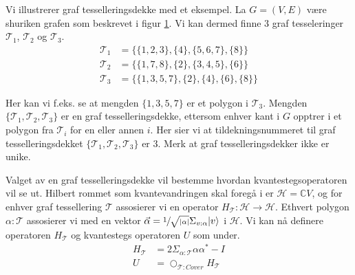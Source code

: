 \begin{figure}
\begin{center}
\begin{tcolorbox}
\begin{subfigure}{0.32\textwidth}
\begin{tikzpicture}[main/.style={draw,circle}, scale=0.75]
                        \end{tikzpicture}
                    \end{subfigure}
                \end{tcolorbox}
            \end{center}
            \label{fig:shuriken}
        \end{figure}

        Vi illustrerer graf tesselleringsdekke med et eksempel. La $G=(V,E)$ være shuriken grafen som beskrevet i figur \ref{fig:shuriken}. Vi kan dermed finne $3$ graf tesseleringer $\mathcal{T}_1$, $\mathcal{T}_2$ og $\mathcal{T}_3$.
        \begin{align*}
            \mathcal{T}_1 & = \{\{1,2,3\},\{4\},\{5,6,7\},\{8\}\} \\
            \mathcal{T}_2 & = \{\{1,7,8\},\{2\},\{3,4,5\},\{6\}\} \\
            \mathcal{T}_3 & = \{\{1,3,5,7\},\{2\},\{4\},\{6\},\{8\}\}
        \end{align*}

        Her kan vi f.eks. se at mengden $\{1,3,5,7\}$ er et polygon i $\mathcal{T}_3$. Mengden $\{\mathcal{T}_1, \mathcal{T}_2, \mathcal{T}_3\}$ er en graf tesselleringsdekke, ettersom enhver kant i $G$ opptrer i et polygon fra $\mathcal{T}_i$ for en eller annen $i$. Her sier vi at tildekningsnummeret til graf tesselleringsdekket $\{\mathcal{T}_1, \mathcal{T}_2, \mathcal{T}_3\}$ er $3$. Merk at graf tesselleringsdekker ikke er unike.

        Valget av en graf tesselleringsdekke vil bestemme hvordan kvantestegsoperatoren vil se ut. Hilbert rommet som kvantevandringen skal foregå i er $\mathcal{H}=\mathbb{C}V$, og for enhver graf tessellering $\mathcal{T}$ assosierer vi en operator $H_{\mathcal{T}}:\mathcal{H}\rightarrow\mathcal{H}$. Ethvert polygon $\alpha:\mathcal{T}$ assosierer vi med en vektor $\vec{\alpha}=\sfrac{1}{\sqrt{|\alpha|}}\Sigma_{v:\alpha}|v\rangle$ i $\mathcal{H}$. Vi kan nå definere operatoren $H_\mathcal{T}$ og kvantestegs operatoren $U$ som under.
        \begin{align*}
            H_\mathcal{T} & =2\Sigma_{\alpha:\mathcal{T}}\alpha\alpha^* - I \\
            U & = \bigcirc_{\mathcal{T}:Cover}H_\mathcal{T}
        \end{align*}

